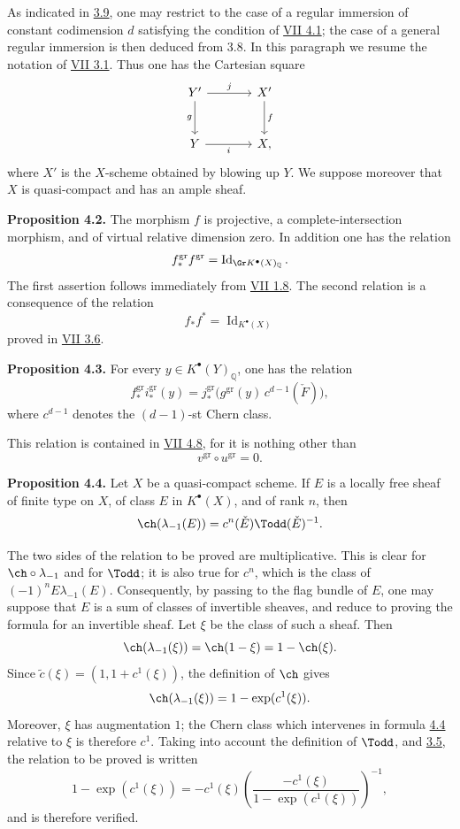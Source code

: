 As indicated in \hyperlink{sga6.e08.para.3-9}{3.9}, one may restrict to the case of a regular immersion of constant codimension \(d\) satisfying the condition of \hyperlink{sga6.e07.lem.4-1}{VII 4.1}; the case of a general regular immersion is then deduced from 3.8. In this paragraph we resume the notation of \hyperlink{sga6.e07.para.3-1}{VII 3.1}. Thus one has the Cartesian square
\[
\begin{tikzcd}[column sep=large,row sep=large]
Y' \arrow[r,"j"] \arrow[d,"g"'] & X' \arrow[d,"f"]\\
Y \arrow[r,"i"'] & X ,
\end{tikzcd}
\]
where \(X'\) is the \(X\)-scheme obtained by blowing up \(Y\). We suppose moreover that \(X\) is quasi-compact and has an ample sheaf.

\textbf{Proposition 4.2.} The morphism \(f\) is projective, a complete-intersection morphism, and of virtual relative dimension zero. In addition one has the relation
\[
 f^{\mathrm{gr}}_* f^{\mathrm{gr}}=\operatorname{Id}_{\Gr K^{\bullet}(X)_{\mathbb Q}} .
\]
The first assertion follows immediately from \hyperlink{sga6.e07.prop.1-8}{VII 1.8}. The second relation is a consequence of the relation
\[
 f_*f^*=\operatorname{Id}_{K^{\bullet}(X)}
\]
proved in \hyperlink{sga6.e07.prop.3-6}{VII 3.6}.

\textbf{Proposition 4.3.} For every \(y\in K^{\bullet}(Y)_{\mathbb Q}\), one has the relation
\[
 f^{\mathrm{gr}}_* i^{\mathrm{gr}}_*(y)
 =
 j^{\mathrm{gr}}_*\bigl(g^{\mathrm{gr}}(y)\,c^{d-1}(\check F)\bigr),
\]
where \(c^{d-1}\) denotes the \((d-1)\)-st Chern class.

This relation is contained in \hyperlink{sga6.e07.thm.4-8}{VII 4.8}, for it is nothing other than
\[
 v^{\mathrm{gr}}\circ u^{\mathrm{gr}}=0 .
\]

\textbf{Proposition 4.4.} Let \(X\) be a quasi-compact scheme. If \(E\) is a locally free sheaf of finite type on \(X\), of class \(E\) in \(K^{\bullet}(X)\), and of rank \(n\), then
\[
 \ch(\lambda_{-1}(E))=c^n(\check E)\Todd(\check E)^{-1}.
\]

The two sides of the relation to be proved are multiplicative. This is clear for \(\ch\circ\lambda_{-1}\) and for \(\Todd\); it is also true for \(c^n\), which is the class of \((-1)^nE\lambda_{-1}(E)\). Consequently, by passing to the flag bundle of \(E\), one may suppose that \(E\) is a sum of classes of invertible sheaves, and reduce to proving the formula for an invertible sheaf. Let \(\xi\) be the class of such a sheaf. Then
\[
 \ch(\lambda_{-1}(\xi))=\ch(1-\xi)=1-\ch(\xi).
\]
Since \(\widetilde c(\xi)=(1,1+c^1(\xi))\), the definition of \(\ch\) gives
\[
 \ch(\lambda_{-1}(\xi))=1-\exp(c^1(\xi)).
\]
Moreover, \(\xi\) has augmentation \(1\); the Chern class which intervenes in formula \hyperlink{sga6.e08.prop.4-4}{4.4} relative to \(\xi\) is therefore \(c^1\). Taking into account the definition of \(\Todd\), and \hyperlink{sga6.e08.prop.3-5}{3.5}, the relation to be proved is written
\[
 1-\exp(c^1(\xi))
 =
 -c^1(\xi)\left(\frac{-c^1(\xi)}{1-\exp(c^1(\xi))}\right)^{-1},
\]
and is therefore verified.

